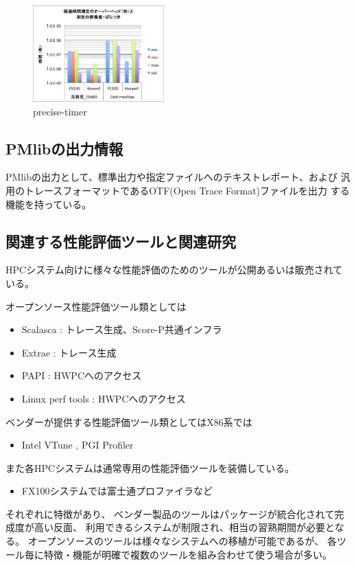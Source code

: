 \documentclass[submit,techrep,noauthor]{ipsj}
\begin{document}
\begin{figure}[tb]
\centering\includegraphics[width=0.45\textwidth]{figs/precise-timer.png}
\caption{precise-timer}
\label{fig:precise-timer}
\end{figure}



\subsection{PMlibの出力情報}
PMlibの出力として、標準出力や指定ファイルへのテキストレポート、および
汎用のトレースフォーマットであるOTF(Open Trace Format)ファイルを出力
する機能を持っている。


\subsection{関連する性能評価ツールと関連研究}

HPCシステム向けに様々な性能評価のためのツールが公開あるいは販売されている。\par
オープンソース性能評価ツール類としては
\begin{itemize}
	\item Scalasca \cite{Scalasca:2017} : トレース生成、Score-P共通インフラ
	\item Extrae \cite{Extrae:webpage} : トレース生成
	\item PAPI \cite{PAPI:5.6} : HWPCへのアクセス
	\item Linux perf tools : HWPCへのアクセス
\end{itemize}
ベンダーが提供する性能評価ツール類としてはX86系では 
\begin{itemize}
		\item Intel VTune \cite{Intel:VTune}, PGI Profiler \cite{PGI:Profiler}
\end{itemize}
また各HPCシステムは通常専用の性能評価ツールを装備している。
\begin{itemize}
	\item FX100システムでは富士通プロファイラなど
\end{itemize}
それぞれに特徴があり、
ベンダー製品のツールはパッケージが統合化されて完成度が高い反面、
利用できるシステムが制限され、相当の習熟期間が必要となる。
オープンソースのツールは様々なシステムへの移植が可能であるが、
各ツール毎に特徴・機能が明確で複数のツールを組み合わせて使う場合が多い。
\end{document}
